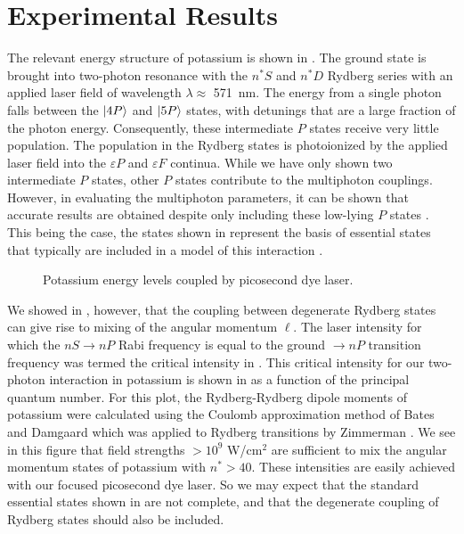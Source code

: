 \section{Experimental Results}
\hspace{\parindent}  The relevant energy structure of potassium is shown in
.  The ground state is brought into two-photon resonance with the
$n^*S$ and $n^*D$ Rydberg series with an applied laser field of
wavelength $\lambda \approx$ 571~nm.  The energy from a single photon
falls between the $\vert 4P \rangle$ and $\vert 5P \rangle$ states, with detunings that are a
large fraction of the photon energy.  Consequently, these intermediate $P$
states receive very little population.  The population in the Rydberg states is
photoionized by the applied laser field into the $\varepsilon P$ and
$\varepsilon F$ continua.  While we have only shown two intermediate $P$
states, other $P$ states contribute to the multiphoton couplings.  However, in
evaluating the multiphoton parameters, it can be shown that accurate results
are obtained despite only including these low-lying $P$ states \cite{Allen:82}.
This being the case, the states shown in  represent the basis of
essential states that typically are included in a model of this
interaction
\cite{Fedorov:89a,Gratl:89,Yeazell:90,Raczynski:93,MIvanov:94,Wojcik:95}.

\begin{figure}[tbp]
\bigskip
{}
{Potassium energy levels coupled by picosecond dye laser.
\label{K_levels}}
\end{figure}

We showed in , however, that the coupling between degenerate
Rydberg states can give rise to mixing of the angular momentum $\ell$.  The
laser intensity for which the $nS \rightarrow nP$ Rabi frequency is equal to
the ground $\rightarrow nP$ transition frequency was termed the
critical intensity in .  This critical intensity for our
two-photon interaction in potassium is shown in  as a function of
the principal quantum number.  For this plot, the Rydberg-Rydberg dipole moments
of potassium were calculated using the Coulomb approximation method of Bates and
Damgaard \cite{Bates:49} which was applied to Rydberg transitions by
Zimmerman \etal \cite{Zimmerman:79}.  We see in this figure that field strengths
$> 10^9$ W/cm$^2$ are sufficient to mix the angular momentum states of potassium with
$n^* > 40$.  These intensities are easily achieved with our focused picosecond
dye laser.  So we may expect that the standard essential states shown in
 are not complete, and that the degenerate coupling of Rydberg
states should also be included.

